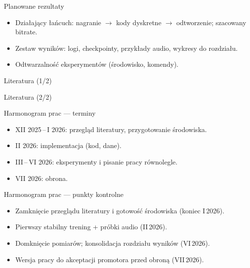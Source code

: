 \documentclass[aspectratio=169,11pt]{beamer}
\begin{document}
\begin{frame}{Planowane rezultaty}
  \begin{itemize}
    \item Działający łańcuch: nagranie $\rightarrow$ kody dyskretne $\rightarrow$ odtworzenie; szacowany bitrate.
    \item Zestaw wyników: logi, checkpointy, przykłady audio, wykresy do rozdziału.
    \item Odtwarzalność eksperymentów (środowisko, komendy).
  \end{itemize}
\end{frame}

\begin{frame}[t,shrink=5]{Literatura (1/2)}
  \vspace{-0.35em}
  \printbibliography[heading=none,keyword=litA]
\end{frame}

\begin{frame}[t,shrink=5]{Literatura (2/2)}
  \vspace{-0.35em}
  \printbibliography[heading=none,keyword=litB]
\end{frame}

\begin{frame}{Harmonogram prac --- terminy}
  \begin{itemize}
    \item XII 2025\,--\,I 2026: przegląd literatury, przygotowanie środowiska.
    \item II 2026: implementacja (kod, dane).
    \item III\,--\,VI 2026: eksperymenty i pisanie pracy równolegle.
    \item VII 2026: obrona.
  \end{itemize}
\end{frame}

\begin{frame}{Harmonogram prac --- punkty kontrolne}
  \begin{itemize}
    \item Zamknięcie przeglądu literatury i gotowość środowiska (koniec I\,2026).
    \item Pierwszy stabilny trening + próbki audio (II\,2026).
    \item Domknięcie pomiarów; konsolidacja rozdziału wyników (VI\,2026).
    \item Wersja pracy do akceptacji promotora przed obroną (VII\,2026).
  \end{itemize}
\end{frame}
\end{document}
